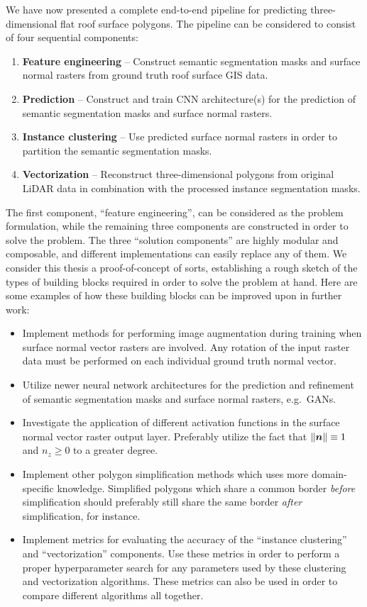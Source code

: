 We have now presented a complete end-to-end pipeline for predicting three-dimensional flat roof surface polygons.
The pipeline can be considered to consist of four sequential components:
%
\begin{enumerate}
  \item \textbf{Feature engineering} -- Construct semantic segmentation masks and surface normal rasters from ground truth roof surface GIS data.
  \item \textbf{Prediction} -- Construct and train CNN architecture(s) for the prediction of semantic segmentation masks and surface normal rasters.
  \item \textbf{Instance clustering} -- Use predicted surface normal rasters in order to partition the semantic segmentation masks.
  \item \textbf{Vectorization} -- Reconstruct three-dimensional polygons from original LiDAR data in combination with the processed instance segmentation masks.
\end{enumerate}
%
The first component, \enquote{feature engineering}, can be considered as the problem formulation, while the remaining three components are constructed in order to solve the problem.
The three \enquote{solution components} are highly modular and composable, and different implementations can easily replace any of them.
We consider this thesis a proof-of-concept of sorts, establishing a rough sketch of the types of building blocks required in order to solve the problem at hand.
Here are some examples of how these building blocks can be improved upon in further work:
%
\begin{itemize}
  \item Implement methods for performing image augmentation during training when surface normal vector rasters are involved.
    Any rotation of the input raster data must be performed on each individual ground truth normal vector.
  \item Utilize newer neural network architectures for the prediction and refinement of semantic segmentation masks and surface normal rasters, e.g.\ GANs.
  \item Investigate the application of different activation functions in the surface normal vector raster output layer.
    Preferably utilize the fact that $\left\lVert\boldsymbol{n}\right\rVert \equiv 1$ and $n_z \geq 0$ to a greater degree.
  \item Implement other polygon simplification methods which uses more domain-specific knowledge.
    Simplified polygons which share a common border \emph{before} simplification should preferably still share the same border \emph{after} simplification, for instance.
  \item Implement metrics for evaluating the accuracy of the \enquote{instance clustering} and \enquote{vectorization} components.
    Use these metrics in order to perform a proper hyperparameter search for any parameters used by these clustering and vectorization algorithms.
    These metrics can also be used in order to compare different algorithms all together.
\end{itemize}
